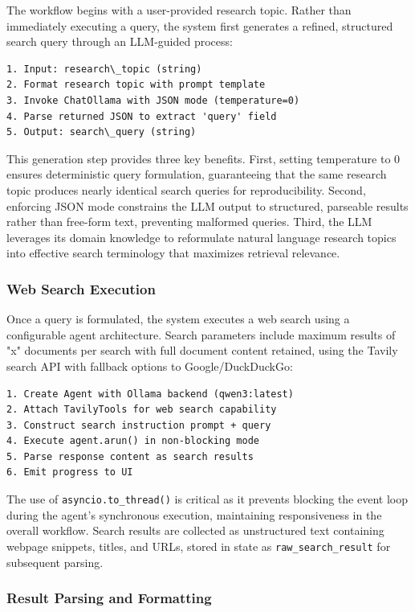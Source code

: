 The workflow begins with a user-provided research topic. Rather than immediately executing a query, the system first generates a refined, structured search query through an LLM-guided process:

\begin{lstlisting}
1. Input: research\_topic (string)
2. Format research topic with prompt template
3. Invoke ChatOllama with JSON mode (temperature=0)
4. Parse returned JSON to extract 'query' field
5. Output: search\_query (string)
\end{lstlisting}

This generation step provides three key benefits. First, setting temperature to 0 ensures deterministic query formulation, guaranteeing that the same research topic produces nearly identical search queries for reproducibility. Second, enforcing JSON mode constrains the LLM output to structured, parseable results rather than free-form text, preventing malformed queries. Third, the LLM leverages its domain knowledge to reformulate natural language research topics into effective search terminology that maximizes retrieval relevance.

\subsubsection{Web Search Execution}

Once a query is formulated, the system executes a web search using a configurable agent architecture. Search parameters include maximum results of "x" documents per search with full document content retained, using the Tavily search API with fallback options to Google/DuckDuckGo:

\begin{lstlisting}
1. Create Agent with Ollama backend (qwen3:latest)
2. Attach TavilyTools for web search capability
3. Construct search instruction prompt + query
4. Execute agent.arun() in non-blocking mode
5. Parse response content as search results
6. Emit progress to UI
\end{lstlisting}

The use of \texttt{asyncio.to\_thread()} is critical as it prevents blocking the event loop during the agent's synchronous execution, maintaining responsiveness in the overall workflow. Search results are collected as unstructured text containing webpage snippets, titles, and URLs, stored in state as \texttt{raw\_search\_result} for subsequent parsing.

\subsubsection{Result Parsing and Formatting}

